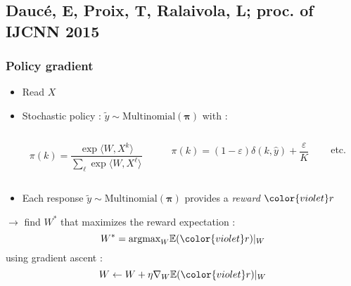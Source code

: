 \documentclass{beamer}
\begin{document}
\subsection{Daucé, E, Proix, T, Ralaivola, L; proc. of IJCNN 2015}

\begin{frame}\frametitle{Policy gradient \cite{Wil92}}
	\small
	\begin{footnotesize}


	\begin{itemize}
		\item Read $X$
		\item Stochastic policy : $\tilde{y} \sim \text{Multinomial}(\boldsymbol{\pi})$ with :
		\begin{columns}[b]
			\begin{column}{.35\linewidth}
				\begin{exampleblock}{}
					$$ \pi(k) = \frac{\exp\langle W, X^k\rangle}{\sum_{\ell}\exp\langle W, X^\ell\rangle}$$
				\end{exampleblock}
			\end{column}
			\begin{column}{.4\linewidth}
				\begin{exampleblock}{}
					$$ \pi(k) =  (1-\varepsilon) \delta(k,\hat{y}) + \frac{\varepsilon}{K} $$
				\end{exampleblock}
			\end{column}
			\begin{column}{.1\linewidth}
				\begin{exampleblock}{}
					etc.
				\end{exampleblock}
			\end{column}				
		\end{columns}
		
		
		\item Each response $\tilde{y} \sim \text{Multinomial}(\boldsymbol{\pi})$ provides a \emph{reward} ${\color{violet}r}$
	\end{itemize}
	    
    $\rightarrow$ find $W^*$ that maximizes the reward expectation :
		$$ W^*  = \text{argmax}_W \mathbb{E}({\color{violet}r})|_W$$
		using gradient ascent : 
		$$ W \leftarrow W + \eta \nabla_W \mathbb{E}({\color{violet}r})|_W $$
	\end{footnotesize}
	\normalsize
\end{frame}
\end{document}

